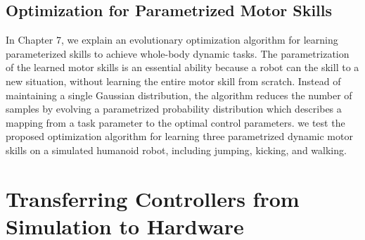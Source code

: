 \subsection{Optimization for Parametrized Motor Skills}
In Chapter 7, we explain an evolutionary optimization algorithm for
learning parameterized skills to achieve whole-body dynamic tasks.
The parametrization of the learned motor skills is an essential ability
because a robot can  the skill to a new situation, without
learning the entire motor skill from scratch.
Instead of maintaining a single Gaussian distribution, 
the algorithm reduces the number of samples by evolving a parametrized
probability distribution which describes a mapping from a task parameter
to the optimal control parameters.
we test the proposed optimization algorithm for learning three parametrized
dynamic motor skills on a simulated humanoid robot, including jumping,
kicking, and walking. 

\section{Transferring Controllers from Simulation to Hardware}

